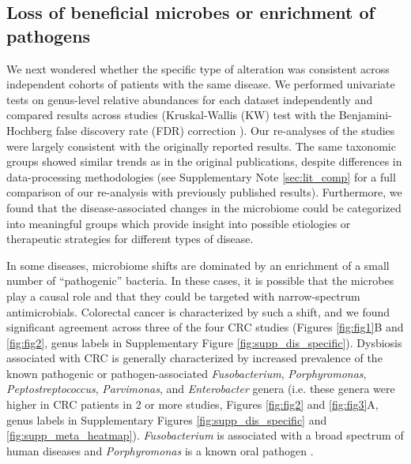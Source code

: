 \subsection{Loss of beneficial microbes or enrichment of pathogens}

We next wondered whether the specific type of alteration was consistent across independent cohorts of patients with the same disease.
We performed univariate tests on genus-level relative abundances for each dataset independently and compared results across studies (Kruskal-Wallis (KW) test with the Benjamini-Hochberg false discovery rate (FDR) correction \cite{benjamini-hochberg}).
Our re-analyses of the studies were largely consistent with the originally reported results.
The same taxonomic groups showed similar trends as in the original publications, despite differences in data-processing methodologies (see Supplementary Note \ref{sec:lit_comp} for a full comparison of our re-analysis with previously published results).
Furthermore, we found that the disease-associated changes in the microbiome could be categorized into meaningful groups which provide insight into possible etiologies or therapeutic strategies for different types of disease.

In some diseases, microbiome shifts are dominated by an enrichment of a small number of ``pathogenic'' bacteria.
In these cases, it is possible that the microbes play a causal role and that they could be targeted with narrow-spectrum antimicrobials.
Colorectal cancer is characterized by such a shift, and we found significant agreement across three of the four CRC studies \cite{crc-zhao,crc-baxter,crc-zeller,crc-xiang} (Figures \ref{fig:fig1}B and \ref{fig:fig2}, genus labels in Supplementary Figure \ref{fig:supp_dis_specific}).
Dysbiosis associated with CRC is generally characterized by increased prevalence of the known pathogenic or pathogen-associated \textit{Fusobacterium}, \textit{Porphyromonas}, \textit{Peptostreptococcus}, \textit{Parvimonas}, and \textit{Enterobacter} genera (i.e. these genera were higher in CRC patients in 2 or more studies, Figures \ref{fig:fig2} and \ref{fig:fig3}A, genus labels in Supplementary Figures \ref{fig:supp_dis_specific} and \ref{fig:supp_meta_heatmap}).
\textit{Fusobacterium} is associated with a broad spectrum of human diseases and \textit{Porphyromonas} is a known oral pathogen \cite{Han2015fusopatho, Flynn2016oral}.

